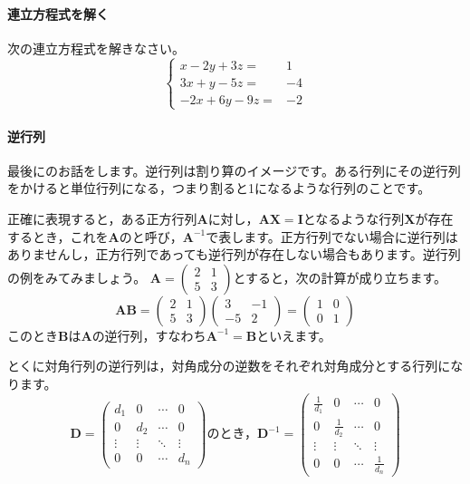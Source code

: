 

\paragraph{連立方程式を解く}次の連立方程式を解きなさい。
\[
	\left\{\begin{array}{rr}x-2 y+3 z= & 1 \\ 3 x+y-5 z= & -4 \\ -2 x+6 y-9 z= & -2\end{array}\right.
\]


\paragraph{逆行列}
最後にのお話をします。逆行列は割り算のイメージです。ある行列にその逆行列をかけると単位行列になる，つまり割ると1になるような行列のことです。

正確に表現すると，ある正方行列$\bm{A}$に対し，$\bm{A}\bm{X}=\bm{I}$となるような行列$\bm{X}$が存在するとき，これを$\bm{A}$のと呼び，$\bm{A}^{-1}$で表します。正方行列でない場合に逆行列はありませんし，正方行列であっても逆行列が存在しない場合もあります。逆行列の例をみてみましょう。
$\bm{A}=\begin{pmatrix}2&1\\5&3\end{pmatrix}$とすると，次の計算が成り立ちます。
\begin{equation*}
	\bm{AB}=\begin{pmatrix}2&1\\5&3\end{pmatrix}\begin{pmatrix}3&-1\\-5&2\end{pmatrix}=\begin{pmatrix}1&0\\0&1\end{pmatrix}
\end{equation*}
このとき$\bm{B}$は$\bm{A}$の逆行列，すなわち$\bm{A}^{-1}=\bm{B}$といえます。

とくに対角行列の逆行列は，対角成分の逆数をそれぞれ対角成分とする行列になります。
\begin{equation*}
	\bm{D} = \begin{pmatrix} d_1    & 0      & \cdots & 0      \\
                0      & d_2    & \cdots & 0      \\
                \vdots & \vdots & \ddots & \vdots \\
                0      & 0      & \cdots & d_n\end{pmatrix}
	\mbox{のとき，}
	\bm{D}^{-1} = \begin{pmatrix} \frac{1}{d_1} & 0             & \cdots & 0             \\
                0             & \frac{1}{d_2} & \cdots & 0             \\
                \vdots        & \vdots        & \ddots & \vdots        \\
                0             & 0             & \cdots & \frac{1}{d_n}\end{pmatrix}
\end{equation*}

